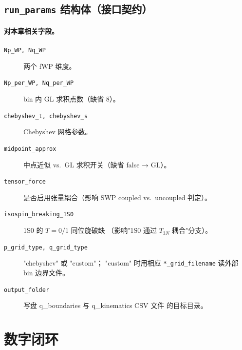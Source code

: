 \subsection{\texttt{run\_params} 结构体（接口契约）}
\label{subsec:ch06-code-runparams}



\paragraph{对本章相关字段。}
\begin{description}
  \item[\texttt{Np\_WP, Nq\_WP}] 两个 fWP 维度。
  \item[\texttt{Np\_per\_WP, Nq\_per\_WP}] bin 内 GL 求积点数（缺省 8）。
  \item[\texttt{chebyshev\_t, chebyshev\_s}] Chebyshev 网格参数。
  \item[\texttt{midpoint\_approx}] 中点近似 vs.~GL 求积开关（缺省 false → GL）。
  \item[\texttt{tensor\_force}] 是否启用张量耦合（影响 SWP coupled vs.~uncoupled
        判定）。
  \item[\texttt{isospin\_breaking\_1S0}] 1S0 的 \(T = 0/1\) 同位旋破缺
        （影响"1S0 通过 \(T_{3N}\) 耦合"分支）。
  \item[\texttt{p\_grid\_type, q\_grid\_type}] "chebyshev" 或 "custom"；
        "custom" 时用相应 \texttt{*\_grid\_filename} 读外部 bin 边界文件。
  \item[\texttt{output\_folder}] 写盘 q\_boundaries 与 q\_kinematics CSV 文件
        的目标目录。
\end{description}

\section{数字闭环}
\label{sec:ch06-numerics}

